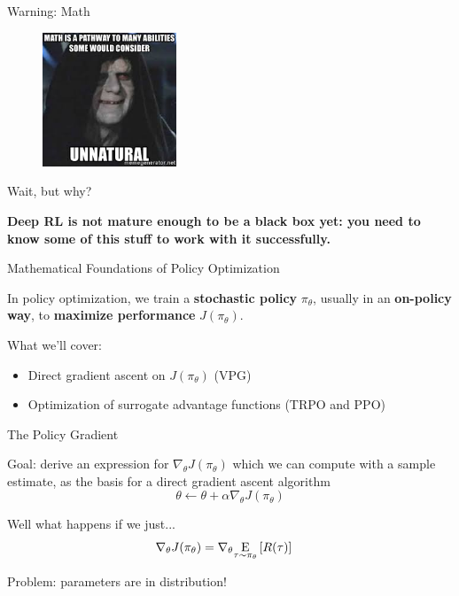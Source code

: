 \documentclass[9pt]{beamer}
\newcommand{\underE}[2]{\underset{\begin{subarray}{c}#1 \end{subarray}}{\E}\left[ #2 \right]}
\begin{document}
\begin{frame}{Warning: Math}

\begin{figure}
\centering
\includegraphics[width=4cm]{palpatine}
\end{figure}

\end{frame}

\begin{frame}{Wait, but why?}


\textbf{Deep RL is not mature enough to be a black box yet: you need to know some of this stuff to work with it successfully.}

\end{frame}

\begin{frame}{Mathematical Foundations of Policy Optimization}

In policy optimization, we train a \textbf{stochastic policy} $\pi_{\theta}$, usually in an \textbf{on-policy way}, to \textbf{maximize performance} $J(\pi_{\theta})$.

\vspace{1em}

What we'll cover:
\begin{itemize}
\item Direct gradient ascent on $J(\pi_{\theta})$ (VPG)
\item Optimization of surrogate advantage functions (TRPO and PPO)
\end{itemize}

\end{frame}

\begin{frame}{The Policy Gradient}

Goal: derive an expression for $\nabla_{\theta} J(\pi_{\theta})$ which we can compute with a sample estimate, as the basis for a direct gradient ascent algorithm
%
\begin{equation*}
\theta \leftarrow \theta + \alpha \nabla_{\theta} J(\pi_{\theta})
\end{equation*}

\pause
\vspace{1em}

Well what happens if we just...
%
\begin{align*}
\nabla_{\theta} J(\pi_{\theta}) &= \nabla_{\theta} \underE{\tau \sim \pi_{\theta}}{R(\tau)}
\end{align*}

Problem: parameters are in distribution!

\end{frame}
\end{document}
